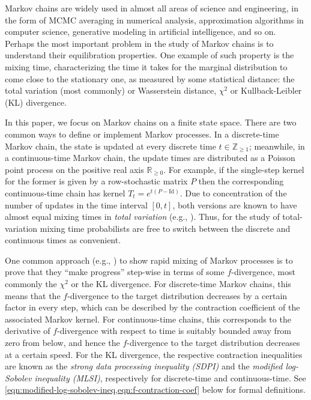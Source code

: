 \documentclass[11pt]{article}
\def\bR{\mathbb{R}}
\def\bZ{\mathbb{Z}}
\newcommand{\nbyp}[1]{{\color{red}[Yury: #1]}}
\theoremstyle{definition}
\begin{document}
Markov chains are widely used in almost all areas of science and engineering, in the form
of MCMC averaging in numerical analysis, approximation algorithms in computer science,
generative modeling in artificial intelligence, and so on. Perhaps the most important problem in the study of
Markov chains is to understand their equilibration properties. One example of such property is
the mixing time, characterizing  the
time it takes for the marginal distribution to come close to the stationary one, as measured by
some statistical distance: the total variation (most commonly) or Wasserstein
distance, $\chi^2$ or Kullback-Leibler (KL) divergence.

In this paper, we focus on Markov chains on a finite state space.  There are two common ways to
define or implement Markov processes.  In a discrete-time Markov chain, the state is updated at
every discrete time $t \in \bZ_{\ge 1}$; meanwhile, in a continuous-time Markov chain, the update
times are distributed as a Poisson point process on the positive real axis $\bR_{\ge 0}$.
For example, if the single-step kernel for the former is given by
a row-stochastic matrix $P$ then the corresponding continuous-time chain has kernel $T_t =
e^{t(P-\mathrm{Id})}$. Due to concentration of the number of updates in the time
interval $[0,t]$, both versions are known to have almost equal mixing times in \textit{total
variation} (e.g., \cite[Theorem 20.3]{levin2017markov}). Thus, for the study of total-variation
mixing time probabilists are free to switch between the discrete and continuous times as convenient.


One common approach (e.g., \cite{diaconis1996logarithmic}) to show rapid mixing of Markov processes is to prove that they ``make progress'' step-wise in terms of some $f$-divergence, most commonly the $\chi^2$ or the KL divergence.
For discrete-time Markov chains, this means that the $f$-divergence to the target distribution
decreases by a certain factor in every step, which can be described by the contraction coefficient
of the associated Markov kernel.
For continuous-time chains, this corresponds to the derivative of $f$-divergence with respect to time is suitably bounded away from zero from below, and hence the $f$-divergence to the target distribution decreases at a certain speed.
For the KL divergence, the respective contraction inequalities are known as the \textit{strong data
processing inequality (SDPI)} and the \textit{modified log-Sobolev inequality (MLSI)}, respectively for
discrete-time and continuous-time. See \cref{eqn:modified-log-sobolev-ineq,eqn:f-contraction-coef} below for formal definitions.
\end{document}
